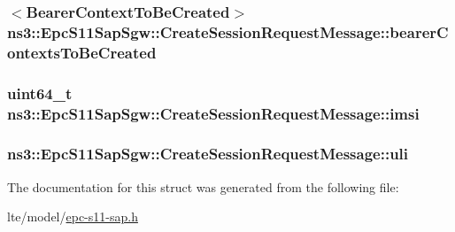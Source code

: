 \subsubsection[{\texorpdfstring{bearer\+Contexts\+To\+Be\+Created}{bearerContextsToBeCreated}}]{$<${\bf Bearer\+Context\+To\+Be\+Created}$>$ ns3\+::\+Epc\+S11\+Sap\+Sgw\+::\+Create\+Session\+Request\+Message\+::bearer\+Contexts\+To\+Be\+Created}\hypertarget{structns3_1_1EpcS11SapSgw_1_1CreateSessionRequestMessage_a287e300d4791a02c3bf6c49d0a10da25}{}\label{structns3_1_1EpcS11SapSgw_1_1CreateSessionRequestMessage_a287e300d4791a02c3bf6c49d0a10da25}
\subsubsection[{\texorpdfstring{imsi}{imsi}}]{\setlength{\rightskip}{0pt plus 5cm}uint64\+\_\+t ns3\+::\+Epc\+S11\+Sap\+Sgw\+::\+Create\+Session\+Request\+Message\+::imsi}\hypertarget{structns3_1_1EpcS11SapSgw_1_1CreateSessionRequestMessage_a58c76624dd25836d24cb6feffa671272}{}\label{structns3_1_1EpcS11SapSgw_1_1CreateSessionRequestMessage_a58c76624dd25836d24cb6feffa671272}
\subsubsection[{\texorpdfstring{uli}{uli}}]{ ns3\+::\+Epc\+S11\+Sap\+Sgw\+::\+Create\+Session\+Request\+Message\+::uli}\hypertarget{structns3_1_1EpcS11SapSgw_1_1CreateSessionRequestMessage_ae1ad7aa455c7f31380c770a857109f02}{}\label{structns3_1_1EpcS11SapSgw_1_1CreateSessionRequestMessage_ae1ad7aa455c7f31380c770a857109f02}


The documentation for this struct was generated from the following file\+:\begin{DoxyCompactItemize}
\item 
lte/model/\hyperlink{epc-s11-sap_8h}{epc-\/s11-\/sap.\+h}\end{DoxyCompactItemize}
